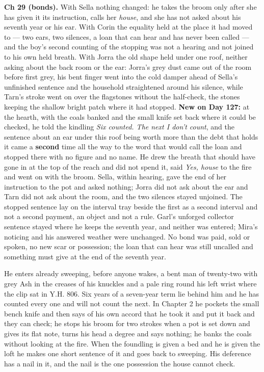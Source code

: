 \documentclass{design/chronicle}
\begin{document}
{\textbf{Ch 29 (bonds).} With Sella nothing changed: he takes the broom only after she has given it its instruction, calls her \emph{house}, and she has not asked about his seventh year or his ear. With Corin the equality held at the place it had moved to — two ears, two silences, a loan that can hear and has never been called — and the boy’s second counting of the stopping was not a hearing and not joined to his own held breath. With Jorra the old shape held under one roof, neither asking about the back room or the ear: Jorra’s grey dust came out of the room before first grey, his bent finger went into the cold damper ahead of Sella’s unfinished sentence and the household straightened around his silence, while Tarn’s stroke went on over the flagstones without the half-check, the stones keeping the shallow bright patch where it had stopped. \textbf{New on Day 127:} at the hearth, with the coals banked and the small knife set back where it could be checked, he told the kindling \emph{Six counted. The next I don’t count}, and the sentence about an ear under this roof being worth more than the debt that holds it came a \textbf{second} time all the way to the word that would call the loan and stopped there with no figure and no name. He drew the breath that should have gone in at the top of the reach and did not spend it, said \emph{Yes, house} to the fire and went on with the broom. Sella, within hearing, gave the end of her instruction to the pot and asked nothing; Jorra did not ask about the ear and Tarn did not ask about the room, and the two silences stayed unjoined. The stopped sentence lay on the interval tray beside the first as a second interval and not a second payment, an object and not a rule. Garl’s unforged collector sentence stayed where he keeps the seventh year, and neither was entered; Mira’s noticing and his answered weather were unchanged. No bond was paid, sold or spoken, no new scar or possession; the loan that can hear was still uncalled and something must give at the end of the seventh year.

He enters already sweeping, before anyone wakes, a bent man of twenty-two with grey Ash in the creases of his knuckles and a pale ring round his left wrist where the clip sat in Y.H. 806. Six years of a seven-year term lie behind him and he has counted every one and will not count the next. In Chapter 2 he pockets the small bench knife and then says of his own accord that he took it and put it back and they can check; he stops his broom for two strokes when a pot is set down and gives its flat note, turns his head a degree and says nothing; he banks the coals without looking at the fire. When the foundling is given a bed and he is given the loft he makes one short sentence of it and goes back to sweeping. His deference has a nail in it, and the nail is the one possession the house cannot check.

}
\end{document}
